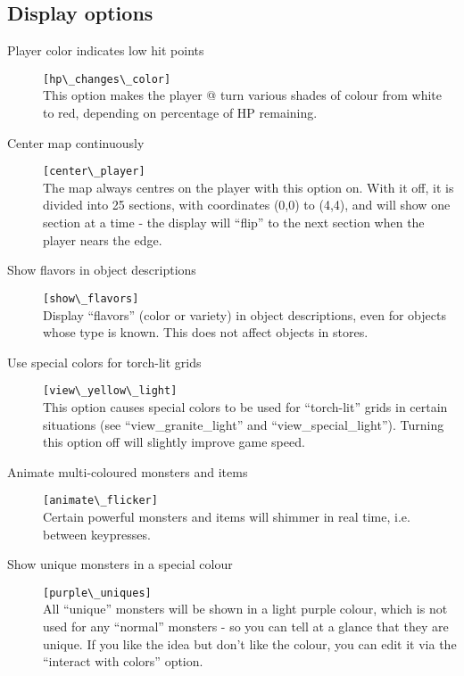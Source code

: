 \subsection{Display options}
\begin{description}
\item[Player color indicates low hit points]
\verb+[hp\_changes\_color]+\\
    This option makes the player @ turn various shades of colour from white
    to red, depending on percentage of HP remaining.

\item[Center map continuously] \verb+[center\_player]+\\
    The map always centres on the player with this option on. With it off, it
    is divided into 25 sections, with coordinates (0,0) to (4,4), and will
    show one section at a time - the display will ``flip'' to the next section
    when the player nears the edge.

\item[Show flavors in object descriptions] \verb+[show\_flavors]+\\
    Display ``flavors'' (color or variety) in object descriptions, even for
    objects whose type is known. This does not affect objects in stores.

\item[Use special colors for torch-lit grids]
\verb+[view\_yellow\_light]+\\
    This option causes special colors to be used for ``torch-lit'' grids in
    certain situations (see ``view\_granite\_light'' and
    ``view\_special\_light'').
    Turning this option off will slightly improve game speed.

\item[Animate multi-coloured monsters and items]
\verb+[animate\_flicker]+\\
    Certain powerful monsters and items will shimmer in real time, i.e.
    between keypresses.

\item[Show unique monsters in a special colour]
\verb+[purple\_uniques]+\\
    All ``unique'' monsters will be shown in a light purple colour, which
    is not used for any ``normal'' monsters - so you can tell at a glance
    that they are unique. If you like the idea but don't like the colour,
    you can edit it via the ``interact with colors'' option.
\end{description}

